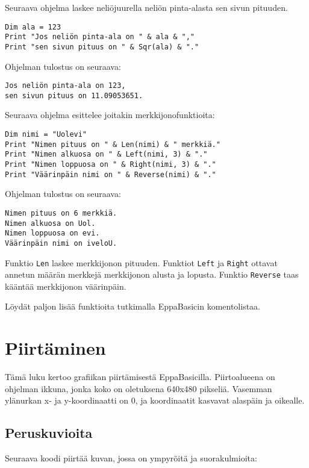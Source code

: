 \documentclass[oneside,11pt,a4paper,finnish]{book}
\begin{document}
Seuraava ohjelma laskee neliöjuurella
neliön pinta-alasta sen sivun pituuden.

\begin{verbatim}
Dim ala = 123
Print "Jos neliön pinta-ala on " & ala & ","
Print "sen sivun pituus on " & Sqr(ala) & "."
\end{verbatim}

Ohjelman tulostus on seuraava:

\begin{verbatim}
Jos neliön pinta-ala on 123,
sen sivun pituus on 11.09053651.
\end{verbatim}

Seuraava ohjelma esittelee joitakin merkkijonofunktioita:

\begin{verbatim}
Dim nimi = "Uolevi"
Print "Nimen pituus on " & Len(nimi) & " merkkiä."
Print "Nimen alkuosa on " & Left(nimi, 3) & "."
Print "Nimen loppuosa on " & Right(nimi, 3) & "."
Print "Väärinpäin nimi on " & Reverse(nimi) & "."
\end{verbatim}

Ohjelman tulostus on seuraava:

\begin{verbatim}
Nimen pituus on 6 merkkiä.
Nimen alkuosa on Uol.
Nimen loppuosa on evi.
Väärinpäin nimi on iveloU.
\end{verbatim}

Funktio \texttt{Len} laskee merkkijonon pituuden.
Funktiot \texttt{Left} ja \texttt{Right}
ottavat annetun määrän merkkejä
merkkijonon alusta ja lopusta.
Funktio \texttt{Reverse} taas kääntää merkkijonon väärinpäin.

Löydät paljon lisää funktioita tutkimalla EppaBasicin komentolistaa.

\chapter{Piirtäminen}

Tämä luku kertoo grafiikan piirtämisestä EppaBasicilla.
Piirtoalueena on ohjelman ikkuna,
jonka koko on oletuksena 640x480 pikseliä.
Vasemman ylänurkan x- ja y-koordinaatti on 0,
ja koordinaatit kasvavat alaspäin ja oikealle.

\section{Peruskuvioita}

Seuraava koodi piirtää kuvan,
jossa on ympyröitä ja suorakulmioita:
\end{document}
